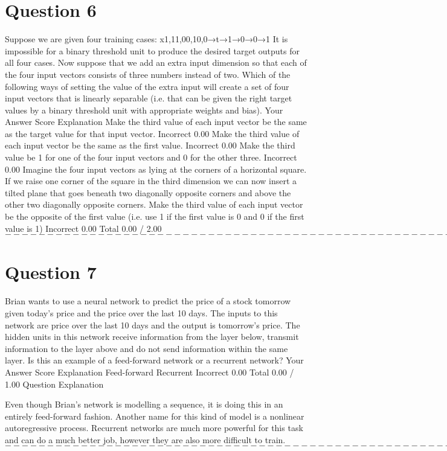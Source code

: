 {\section*{Question 6}
Suppose we are given four training cases: 
x1,11,00,10,0→t→1→0→0→1 
It is impossible for a binary threshold unit to produce the desired target outputs for all four cases. Now suppose that we add an extra input dimension so that each of the four input vectors consists of three numbers instead of two. 
Which of the following ways of setting the value of the extra input will create a set of four input vectors that is linearly separable (i.e. that can be given the right target values by a binary threshold unit with appropriate weights and bias).
Your Answer		Score	Explanation
Make the third value of each input vector be the same as the target value for that input vector.	Incorrect	0.00	
Make the third value of each input vector be the same as the first value.	Incorrect	0.00	
Make the third value be 1 for one of the four input vectors and 0 for the other three.	Incorrect	0.00	Imagine the four input vectors as lying at the corners of a horizontal square. If we raise one corner of the square in the third dimension we can now insert a tilted plane that goes beneath two diagonally opposite corners and above the other two diagonally opposite corners.
Make the third value of each input vector be the opposite of the first value (i.e. use 1 if the first value is 0 and 0 if the first value is 1)	Incorrect	0.00	
Total		0.00 / 2.00	
$----------------------------------------------------------------------------$
\newpage
\section*{Question 7}
Brian wants to use a neural network to predict the price of a stock tomorrow given today's price and the price over the last 10 days. The inputs to this network are price over the last 10 days and the output is tomorrow's price. The hidden units in this network receive information from the layer below, transmit information to the layer above and do not send information within the same layer. Is this an example of a feed-forward network or a recurrent network?
Your Answer		Score	Explanation
Feed-forward			
Recurrent	Incorrect	0.00	
Total		0.00 / 1.00	
Question Explanation

Even though Brian's network is modelling a sequence, it is doing this in an entirely feed-forward fashion. Another name for this kind of model is a nonlinear autoregressive process. Recurrent networks are much more powerful for this task and can do a much better job, however they are also more difficult to train.
$----------------------------------------------------------------------------$
\newpage
}
